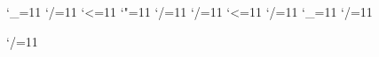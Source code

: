 {%
	\global\let\LD@TeX@meaning@Saved\meaning
	\catcode`\_=11\relax
	\catcode`/=11\relax
	\catcode`<=11\relax
	\catcode`"=11\relax
	\gdef\meaning#1>{%
		\LD@XML@Read
		\edef\LD@Test{#1}%
		\let\LD@XML@Next\LD@XML@meaning@drop
		\ifx\LD@Test\LD@Empty
			\let\LD@XML@Next\LD@XML@meaning@en
		\fi
		\edef\LD@Test{#1"fr"}%
		\LD@String@Split\LD@Test{"fr"}\LD@trash\LD@Test
		\unless\ifx\LD@Test\LD@Empty
			\let\LD@XML@Next\LD@XML@meaning@fr
		\fi
		\LD@XML@Next
	}%
	\gdef\LD@XML@meaning@drop#1</meaning>{%
		\LD@XML@Parse
	}%
	\gdef\LD@XML@meaning@en#1</meaning>{%
		\ifx\LD@Meaning@en\LD@Empty
			\edef\LD@Meaning@en{#1}%
		\else
			\edef\LD@Meaning@en{\LD@Meaning@en,#1}%
		\fi
		\LD@XML@Parse
	}%
	\gdef\LD@XML@meaning@fr#1</meaning>{%
		\ifx\LD@Meaning@fr\LD@Empty
			\edef\LD@Meaning@fr{#1}%
		\else
			\edef\LD@Meaning@fr{\LD@Meaning@fr,#1}%
		\fi
		\LD@XML@Parse
	}%
}%
{%
	\catcode`/=11\relax
	\gdef\/rmgroup>{%
		\LD@XML@Read
		\LD@XML@/rmgroup
	}%
	\gdef\LD@XML@/rmgroup{%
		\ifx\LD@Meaning@fr\LD@Empty
			\edef\LD@Reading@Grouped{\LD@Reading@Grouped\LD@Space : \LD@Meaning@en}%
			\ifx\LD@Meaning@Buffer\LD@Empty
				\edef\LD@Meaning@Buffer{\LD@Meaning@en}%
			\else
				\edef\LD@Meaning@Buffer{\LD@Meaning@Buffer, \LD@Meaning@en}%
			\fi
		\else
			\edef\LD@Reading@Grouped{\LD@Reading@Grouped\LD@Space : \LD@Meaning@fr}%
			\ifx\LD@Meaning@Buffer\LD@Empty
				\edef\LD@Meaning@Buffer{\LD@Meaning@fr}%
			\else
				\edef\LD@Meaning@Buffer{\LD@Meaning@Buffer, \LD@Meaning@fr}%
			\fi
		\fi
		\LD@XML@Parse
	}%
}%
{%
	\catcode`/=11\relax
	\catcode`<=11\relax
	\gdef\nanori>{%
		\LD@XML@Read
		\LD@XML@nanori
	}%
	\gdef\LD@XML@nanori#1</nanori>{%
		\ifx\LD@Reading@Nanori\LD@Empty
			\edef\LD@Reading@Nanori{#1}%
		\else
			\edef\LD@Reading@Nanori{\LD@Reading@Nanori,#1}%
		\fi
		\LD@XML@Parse
	}%
}%
{%
	\catcode`/=11\relax
	\catcode`_=11\relax
	\gdef\/reading_meaning>{%
		\LD@XML@Read
		\LD@XML@/reading_meaning
	}%
	\gdef\LD@XML@/reading_meaning{%
		\LD@XML@Parse
	}%
}%
{%
	\catcode`/=11\relax
	\gdef\/character>{%
		\LD@XML@Read
		\LD@XML@/character
	}%
	\gdef\LD@XML@/character{%
		\LD@XML@character@Do
		\LD@XML@Parse
	}%
}%

{%
	\catcode`/=11\relax
	\gdef\/kanjidic#1>{%
		\LD@XML@Read
		\LD@XML@/kanjidic
	}%
	\gdef\LD@XML@/kanjidic{%
		\global\let\meaning\LD@TeX@meaning@Saved
		\endinput
	}%
}%
\def\Ignore #1\Ignore{}
\endinput
